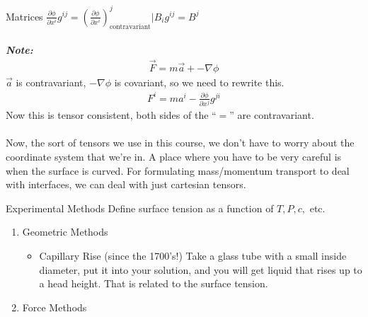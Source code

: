\documentclass{article}
\newcommand{\note}[1]{\\\\\textit{\textbf{Note: }}#1\\\\}
\newcommand{\pOne}[2]{\frac{\partial #1}{\partial #2}}
\begin{document}
\begin{section}{Matrices}
	 $\pOne{\phi}{x^i} g^{ij} = \left(\pOne{\phi}{x^i}\right)_\text{contravariant}^j | B_i g^{ij} = B^j$
	 \note{\begin{align*}\vec{F} = m\vec{a} + -\nabla \phi\end{align*}
	$\vec{a}$ is contravariant, $-\nabla\phi$ is covariant, so we need to rewrite this.
	\begin{align*}
		F^i = ma^i - \pOne{\phi}{x^j}g^{ji}
	\end{align*}
Now this is tensor consistent, both sides of the ``$=$'' are contravariant.}

	Now, the sort of tensors we use in this course, we don't have to worry about the coordinate system that we're in. A place where you have to be very careful is when the surface is curved. For formulating mass/momentum transport to deal with interfaces, we can deal with just cartesian tensors.



\end{section}
\begin{section}{Experimental Methods}
  Define surface tension as a function of $T,P,c,$ etc.
  \begin{enumerate}
    \item Geometric Methods
      \begin{itemize}
	\item Capillary Rise (since the 1700's!) Take a glass tube with a small inside diameter, put it into your solution, and you will get liquid that rises up to a head height. That is related to the surface tension.
      \end{itemize}
    \item Force Methods
  \end{enumerate}
\end{section}
\end{document}
